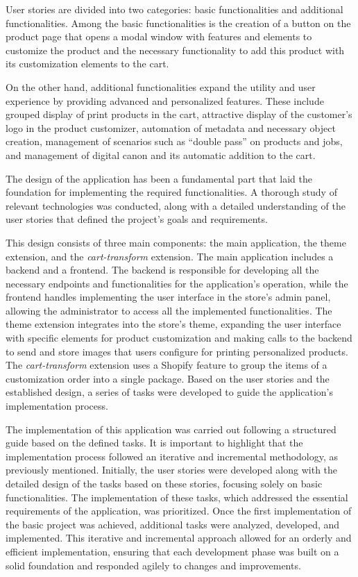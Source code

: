 \documentclass[11pt]{article}
\begin{document}
User stories are divided into two categories: basic functionalities and additional functionalities. Among the basic functionalities is 
the creation of a button on the product page that opens a modal window with features and elements to customize the product and the necessary
functionality to add this product with its customization elements to the cart.

On the other hand, additional functionalities expand the utility and user experience by providing advanced and personalized features. 
These include grouped display of print products in the cart, attractive display of the customer's logo in the product customizer, 
automation of metadata and necessary object creation, management of scenarios such as ``double pass'' on products and jobs, and management
of digital canon and its automatic addition to the cart.

The design of the application has been a fundamental part that laid the foundation for implementing the required functionalities. 
A thorough study of relevant technologies was conducted, along with a detailed understanding of the user stories that defined 
the project's goals and requirements.

This design consists of three main components: the main application, the theme extension, and the \textit{cart-transform} extension.
The main application includes a backend and a frontend. The backend is responsible for developing all the necessary 
endpoints and functionalities for the application’s operation, while the frontend handles implementing the user interface 
in the store's admin panel, allowing the administrator to access all the implemented functionalities. The theme extension 
integrates into the store’s theme, expanding the user interface with specific elements for product customization and making 
calls to the backend to send and store images that users configure for printing personalized products. The \textit{cart-transform} 
extension uses a Shopify feature to group the items of a customization order into a single package. Based on the user stories and 
the established design, a series of tasks were developed to guide the application’s implementation process.

The implementation of this application was carried out following a structured guide based on the defined tasks. 
It is important to highlight that the implementation process followed an iterative and incremental methodology, 
as previously mentioned. Initially, the user stories were developed along with the detailed design of the tasks 
based on these stories, focusing solely on basic functionalities. The implementation of these tasks, which addressed 
the essential requirements of the application, was prioritized. Once the first implementation of the basic project was 
achieved, additional tasks were analyzed, developed, and implemented. This iterative and incremental approach allowed 
for an orderly and efficient implementation, ensuring that each development phase was built on a solid foundation and 
responded agilely to changes and improvements.
\end{document}
